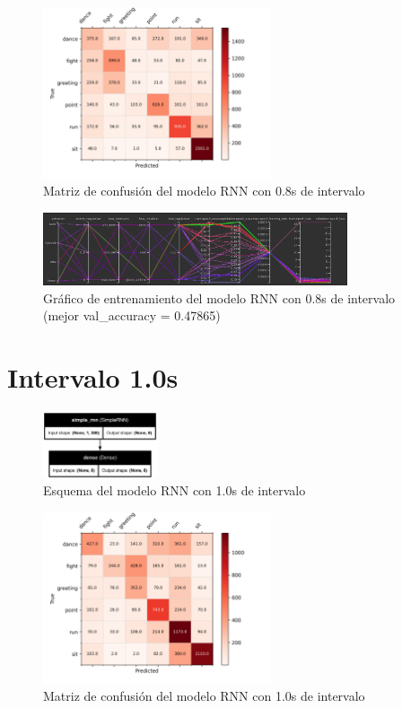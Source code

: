 \begin{figure}[H]
    \centering
    \includegraphics[width=0.6\textwidth]{Imagenes/Bitmap/CM_best-rnn0.8.png}
    \caption{Matriz de confusión del modelo RNN con 0.8s de intervalo}
    \label{fig:rnn-0.8-matriz}
\end{figure}

\begin{figure}[H]
    \centering
    \includegraphics[width=0.8\textwidth]{Imagenes/Bitmap/tb-rnn-0.8.png}
    \caption{Gráfico de entrenamiento del modelo RNN con 0.8s de intervalo (mejor val\_accuracy = 0.47865)}
    \label{fig:rnn-0.8-grafico}
\end{figure}

\section{Intervalo 1.0s}

\begin{figure}[H]
    \centering
    \includegraphics[width=0.3\textwidth]{Imagenes/Bitmap/best-rnn1.0.png}
    \caption{Esquema del modelo RNN con 1.0s de intervalo}
    \label{fig:rnn-1.0-final}
\end{figure}

\begin{figure}[H]
    \centering
    \includegraphics[width=0.6\textwidth]{Imagenes/Bitmap/CM_best-rnn1.0.png}
    \caption{Matriz de confusión del modelo RNN con 1.0s de intervalo}
    \label{fig:rnn-1.0-matriz}
\end{figure}

